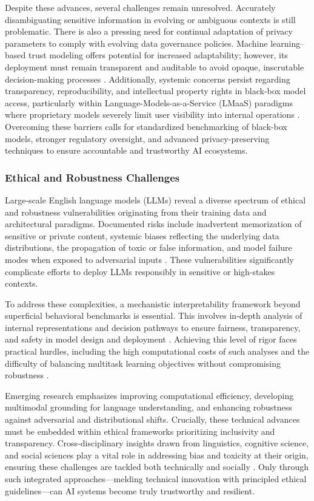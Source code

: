 Despite these advances, several challenges remain unresolved. Accurately disambiguating sensitive information in evolving or ambiguous contexts is still problematic. There is also a pressing need for continual adaptation of privacy parameters to comply with evolving data governance policies. Machine learning–based trust modeling offers potential for increased adaptability; however, its deployment must remain transparent and auditable to avoid opaque, inscrutable decision-making processes \cite{ref11}. Additionally, systemic concerns persist regarding transparency, reproducibility, and intellectual property rights in black-box model access, particularly within Language-Models-as-a-Service (LMaaS) paradigms where proprietary models severely limit user visibility into internal operations \cite{ref8}. Overcoming these barriers calls for standardized benchmarking of black-box models, stronger regulatory oversight, and advanced privacy-preserving techniques to ensure accountable and trustworthy AI ecosystems.

\subsubsection{Ethical and Robustness Challenges}

Large-scale English language models (LLMs) reveal a diverse spectrum of ethical and robustness vulnerabilities originating from their training data and architectural paradigms. Documented risks include inadvertent memorization of sensitive or private content, systemic biases reflecting the underlying data distributions, the propagation of toxic or false information, and model failure modes when exposed to adversarial inputs \cite{ref34}. These vulnerabilities significantly complicate efforts to deploy LLMs responsibly in sensitive or high-stakes contexts.

To address these complexities, a mechanistic interpretability framework beyond superficial behavioral benchmarks is essential. This involves in-depth analysis of internal representations and decision pathways to ensure fairness, transparency, and safety in model design and deployment \cite{ref11,ref12,ref13,ref34,ref35}. Achieving this level of rigor faces practical hurdles, including the high computational costs of such analyses and the difficulty of balancing multitask learning objectives without compromising robustness \cite{ref16}.

Emerging research emphasizes improving computational efficiency, developing multimodal grounding for language understanding, and enhancing robustness against adversarial and distributional shifts. Crucially, these technical advances must be embedded within ethical frameworks prioritizing inclusivity and transparency. Cross-disciplinary insights drawn from linguistics, cognitive science, and social sciences play a vital role in addressing bias and toxicity at their origin, ensuring these challenges are tackled both technically and socially \cite{ref34,ref35}. Only through such integrated approaches—melding technical innovation with principled ethical guidelines—can AI systems become truly trustworthy and resilient.

